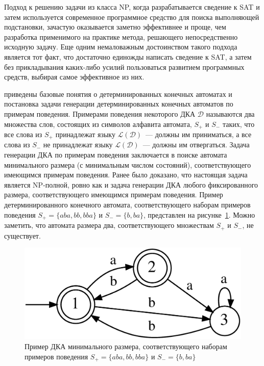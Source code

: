 Подход к решению задачи из класса NP, когда разрабатывается сведение к SAT и затем используется современное программное средство для поиска выполняющей подстановки, зачастую оказывается заметно эффективнее и проще, чем разработка применимого на практике метода, решающего непосредственно исходную задачу.
Еще одним немаловажным достоинством такого подхода является тот факт, что достаточно единожды написать сведение к SAT, а затем без прикладывания каких-либо усилий пользоваться развитием программных средств, выбирая самое эффективное из них.

\insection{\ref{sec:review:dfa-inf}} приведены базовые понятия о детерминированных конечных автоматах и постановка задачи генерации детерминированных конечных автоматов по примерам поведения. 
Примерами поведения некоторого ДКА $\mathcal{D}$ называются два множества слов, состоящих из символов алфавита автомата, $S_{+}$ и $S_{-}$ таких, что все слова из $S_{+}$ принадлежат языку $\mathcal{L}\left(\mathcal{D}\right)$~--- должны им приниматься, а все слова из $S_{-}$ не принадлежат языку $\mathcal{L}\left(\mathcal{D}\right)$~--- должны им отвергаться.
Задача генерации ДКА по примерам поведения заключается в поиске автомата минимального размера (с минимальным числом состояний), соответствующего имеющимся примерам поведения.
Ранее было доказано, что настоящая задача является NP-полной, ровно как и задача генерации ДКА любого фиксированного размера, соответствующего имеющимся примерам поведения.
Пример детерминированного конечного автомата, соответствующего наборам примеров поведения $S_{+} = \{aba, bb, bba\}$ и $S_{-} = \{b, ba\}$, представлен на рисунке~\ref{syn:img:dfa-ex}.
Можно заметить, что автомата размера два, соответствующего множествам $S_{+}$ и $S_{-}$, не существует.

\begin{figure}[ht]
  \centering
  \includegraphics[scale=0.16]{img/datamod/FIG1.eps}
  \caption{Пример ДКА минимального размера, соответствующего наборам примеров поведения $S_{+} = \{aba, bb, bba\}$ и $S_{-} = \{b, ba\}$}
  \label{syn:img:dfa-ex}
\end{figure}


